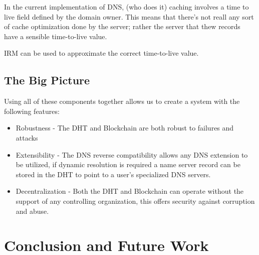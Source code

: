 \documentclass[11pt]{IEEEtran} %
\begin{document}
In the current implementation of DNS, (who does it) caching involves a time to live field defined by the domain owner. This means that there's not reall any sort of cache optimization done by the server; rather the server that thew records have a sensible time-to-live value.



IRM \cite{irm}  can be used to approximate the correct time-to-live value.


\subsection{The Big Picture}
Using all of these components together allows us to create a system with the following features:
\begin{itemize}
	\item Robustness - The DHT and Blockchain are both robust to failures and attacks
	\item Extensibility - The DNS reverse compatibility allows any DNS extension to be utilized, if dynamic resolution is required a name server record can be stored in the DHT to point to a user's specialized DNS servers.
	\item Decentralization - Both the DHT and Blockchain can operate without the support of any controlling organization, this offers security against corruption and abuse.
\end{itemize}	


\section{Conclusion and Future Work}


\end{document}
